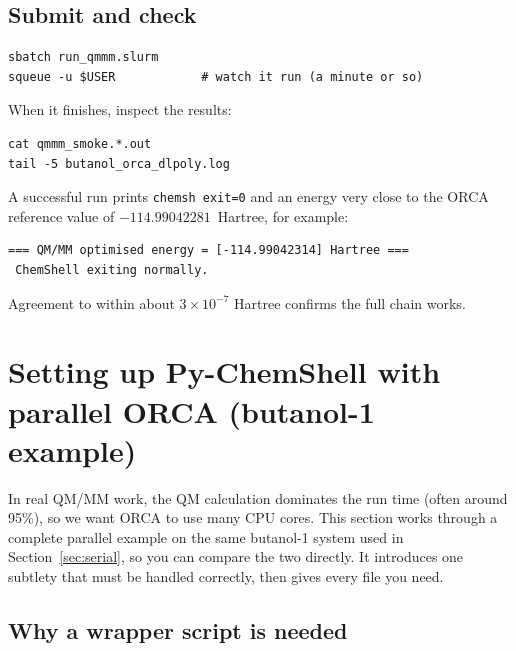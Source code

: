 \documentclass[12pt,a4paper]{article}
\begin{document}
\subsection{Submit and check}

\begin{lstlisting}[style=shell]
sbatch run_qmmm.slurm
squeue -u $USER            # watch it run (a minute or so)
\end{lstlisting}

When it finishes, inspect the results:

\begin{lstlisting}[style=shell]
cat qmmm_smoke.*.out
tail -5 butanol_orca_dlpoly.log
\end{lstlisting}

A successful run prints \texttt{chemsh exit=0} and an energy very close to the
ORCA reference value of $-114.99042281$~Hartree, for example:

\begin{lstlisting}[style=output]
=== QM/MM optimised energy = [-114.99042314] Hartree ===
 ChemShell exiting normally.
\end{lstlisting}

Agreement to within about $3\times10^{-7}$ Hartree confirms the full chain works.

\section{Setting up Py-ChemShell with parallel ORCA (bu\-ta\-nol-1 example)}
\label{sec:parallel}
\setcounter{subsection}{-1}

In real QM/MM work, the QM calculation dominates the run time (often around
95\%), so we want ORCA to use many CPU cores. This section works through a
complete parallel example on the same butanol-1 system used in
Section~\ref{sec:serial}, so you can compare the two directly. It introduces one
subtlety that must be handled correctly, then gives every file you need.

\subsection{Why a wrapper script is needed}
\end{document}
